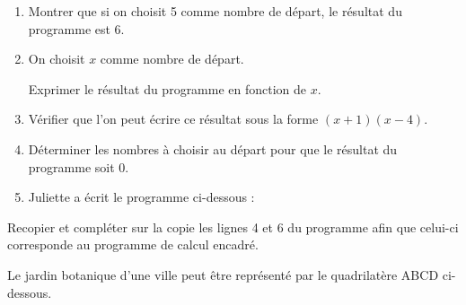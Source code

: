 \documentclass[a4paper,12pt]{article}
\newcommand{\exercice}[2]{%
  \newpage
  \noindent{\Large\bfseries Exercice #1\hspace{0.3em}{\normalfont\normalsize(#2 points)}}%
  \par\vspace{0.7cm}%
}
\begin{document}
\begin{enumerate}[itemsep=4pt]
  \item Montrer que si on choisit 5 comme nombre de départ, le résultat du programme est 6.
  \item On choisit $x$ comme nombre de départ.

  Exprimer le résultat du programme en fonction de $x$.
  \item Vérifier que l'on peut écrire ce résultat sous la forme $(x + 1)(x - 4)$.
  \item Déterminer les nombres à choisir au départ pour que le résultat du programme soit 0.
  \item Juliette a écrit le programme ci-dessous :

\begin{center}
\begin{scratch}
\end{scratch}
\end{center}
\end{enumerate}

\medskip

Recopier et compléter sur la copie les lignes 4 et 6 du programme afin que celui-ci corresponde au programme de calcul encadré.

\exercice{4}{3}

Le jardin botanique d'une ville peut être représenté par le quadrilatère ABCD ci-dessous.

\medskip
\end{document}
